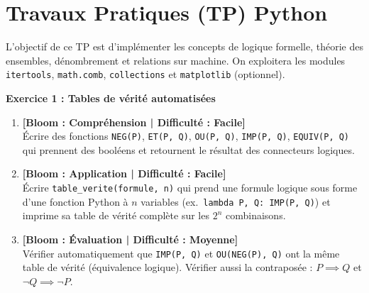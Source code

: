 \section*{Travaux Pratiques (TP) Python}

\vspace{0.3cm}
\noindent L'objectif de ce TP est d'implémenter les concepts de logique formelle, théorie des ensembles, dénombrement et relations sur machine. On exploitera les modules \texttt{itertools}, \texttt{math.comb}, \texttt{collections} et \texttt{matplotlib} (optionnel).

\vspace{0.3cm}

\noindent\textbf{Exercice 1 : Tables de vérité automatisées}
\begin{enumerate}
    \item \textbf{[Bloom : Compréhension | Difficulté : Facile]} \\
    Écrire des fonctions \texttt{NEG(P)}, \texttt{ET(P, Q)}, \texttt{OU(P, Q)}, \texttt{IMP(P, Q)}, \texttt{EQUIV(P, Q)} qui prennent des booléens et retournent le résultat des connecteurs logiques.
    \item \textbf{[Bloom : Application | Difficulté : Facile]} \\
    Écrire \texttt{table\_verite(formule, n)} qui prend une formule logique sous forme d'une fonction Python à $n$ variables (ex.\ \texttt{lambda P, Q: IMP(P, Q)}) et imprime sa table de vérité complète sur les $2^n$ combinaisons.
    \item \textbf{[Bloom : Évaluation | Difficulté : Moyenne]} \\
    Vérifier automatiquement que \texttt{IMP(P, Q)} et \texttt{OU(NEG(P), Q)} ont la même table de vérité (équivalence logique). Vérifier aussi la contraposée : $P \implies Q$ et $\neg Q \implies \neg P$.
\end{enumerate}

\vspace{0.3cm}

